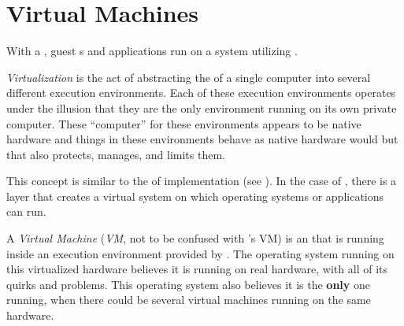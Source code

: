 \section{Virtual Machines}\label{sec:Virtual_Machines}
With a , guest s and applications run on a system utilizing .

\begin{definition}[Virtualization]\label{def:Virtualization}
  \emph{Virtualization} is the act of abstracting the  of a single computer into several different execution environments.
  Each of these execution environments operates under the illusion that they are the only environment running on its own private computer.
  These ``computer'' for these environments appears to be native hardware and things in these environments behave as native hardware would but that also protects, manages, and limits them.
\end{definition}

This concept is similar to the  of  implementation (see ).
In the case of , there is a layer that creates a virtual system on which operating systems or applications can run.

\begin{definition}\label{def:Virtual_Machine}
  A \emph{Virtual Machine} (\emph{VM}, not to be confused with 's VM) is an  that is running inside an execution environment provided by .
  The operating system running on this virtualized hardware believes it is running on real hardware, with all of its quirks and problems.
  This operating system also believes it is the \textbf{only} one running, when there could be several virtual machines running on the same hardware.
\end{definition}


